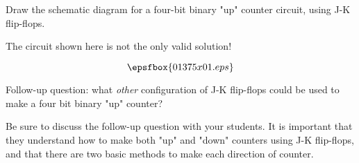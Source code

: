 

Draw the schematic diagram for a four-bit binary "up" counter circuit, using J-K flip-flops.







The circuit shown here is not the only valid solution!

$$\epsfbox{01375x01.eps}$$

\vskip 10pt

Follow-up question: what {\it other} configuration of J-K flip-flops could be used to make a four bit binary "up" counter?







Be sure to discuss the follow-up question with your students.  It is important that they understand how to make both "up" and "down" counters using J-K flip-flops, and that there are two basic methods to make each direction of counter.




